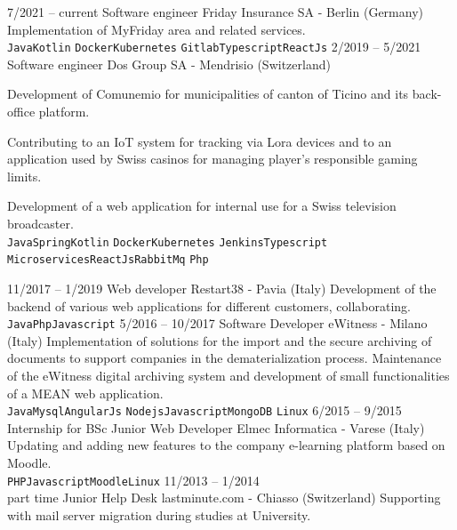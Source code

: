 \documentclass[9pt]{developercv} %
\begin{document}
\begin{entrylist}
    \entry
		{7/2021 -- current}
		{Software engineer}
		{Friday Insurance SA - Berlin (Germany)}
		{Implementation of MyFriday area and related services.\\
        \texttt{Java}\slashsep\texttt{Kotlin}
        \slashsep\texttt{Docker}\slashsep\texttt{Kubernetes}
        \slashsep\texttt{Gitlab}\slashsep\texttt{Typescript}\slashsep\texttt{ReactJs}}
	\entry
		{2/2019 -- 5/2021}
		{Software engineer}
		{Dos Group SA - Mendrisio (Switzerland)}
		{Development of Comunemio for municipalities of canton of Ticino and its back-office platform.

        Contributing to an IoT system for tracking via Lora devices and to an application used by Swiss casinos for managing player's responsible gaming limits.

        Development of a web application for internal use for a Swiss television broadcaster.\\
        \texttt{Java}\slashsep\texttt{Spring}\slashsep\texttt{Kotlin}
        \slashsep\texttt{Docker}\slashsep\texttt{Kubernetes}
        \slashsep\texttt{Jenkins}\slashsep\texttt{Typescript}\\
        \texttt{Microservices}\slashsep\texttt{ReactJs}\slashsep\texttt{RabbitMq}
        \slashsep\texttt{Php}}
	\entry
		{11/2017 -- 1/2019}
		{Web developer}
		{Restart38 - Pavia (Italy)}
		{Development of the backend of various web applications for different customers, collaborating.
		\\ \texttt{Java}\slashsep\texttt{Php}\slashsep\texttt{Javascript}}
	\entry
		{5/2016 -- 10/2017}
		{Software Developer}
		{eWitness - Milano (Italy)}
		{Implementation of solutions for the import and the secure archiving of documents to support companies in the dematerialization process.
        Maintenance of the eWitness digital archiving system and development of small functionalities of a MEAN web application.\\
        \texttt{Java}\slashsep\texttt{Mysql}\slashsep\texttt{AngularJs}
        \slashsep\texttt{Nodejs}\slashsep\texttt{Javascript}\slashsep\texttt{MongoDB}
        \slashsep\texttt{Linux}}
	\entry
		{6/2015 -- 9/2015\\\footnotesize{Internship for BSc}}
		{Junior Web Developer}
		{Elmec Informatica - Varese (Italy)}
		{Updating and adding new features to the company e-learning platform based on Moodle.\\
        \texttt{PHP}\slashsep\texttt{Javascript}\slashsep\texttt{Moodle}\slashsep\texttt{Linux}}
	\entry
		{11/2013 -- 1/2014\\\footnotesize{part time}}
		{Junior Help Desk}
		{lastminute.com - Chiasso (Switzerland)}
		{Supporting with mail server migration during studies at University.}
\end{entrylist}
\end{document}
